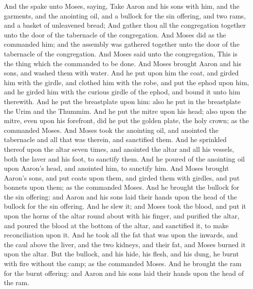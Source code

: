 \begin{biblechapter} %
 And the \LORD spake unto Moses, saying,
\verse Take Aaron and his sons with him, and the garments, and the anointing oil, and a bullock for the sin offering, and two rams, and a basket of unleavened bread;
\verse And gather thou all the congregation together unto the door of the tabernacle of the congregation.
\verse And Moses did as the \LORD commanded him; and the assembly was gathered together unto the door of the tabernacle of the congregation.
\verse And Moses said unto the congregation, This is the thing which the \LORD commanded to be done.
\verse And Moses brought Aaron and his sons, and washed them with water.
\verse And he put upon him the coat, and girded him with the girdle, and clothed him with the robe, and put the ephod upon him, and he girded him with the curious girdle of the ephod, and bound it unto him therewith.
\verse And he put the breastplate upon him: also he put in the breastplate the Urim and the Thummim.
\verse And he put the mitre upon his head; also upon the mitre, even upon his forefront, did he put the golden plate, the holy crown; as the \LORD commanded Moses.
\verse And Moses took the anointing oil, and anointed the tabernacle and all that was therein, and sanctified them.
\verse And he sprinkled thereof upon the altar seven times, and anointed the altar and all his vessels, both the laver and his foot, to sanctify them.
\verse And he poured of the anointing oil upon Aaron's head, and anointed him, to sanctify him.
\verse And Moses brought Aaron's sons, and put coats upon them, and girded them with girdles, and put bonnets upon them; as the \LORD commanded Moses.
\verse And he brought the bullock for the sin offering: and Aaron and his sons laid their hands upon the head of the bullock for the sin offering.
\verse And he slew it; and Moses took the blood, and put it upon the horns of the altar round about with his finger, and purified the altar, and poured the blood at the bottom of the altar, and sanctified it, to make reconciliation upon it.
\verse And he took all the fat that was upon the inwards, and the caul above the liver, and the two kidneys, and their fat, and Moses burned it upon the altar.
\verse But the bullock, and his hide, his flesh, and his dung, he burnt with fire without the camp; as the \LORD commanded Moses.
\verse And he brought the ram for the burnt offering: and Aaron and his sons laid their hands upon the head of the ram.

\end{biblechapter}
